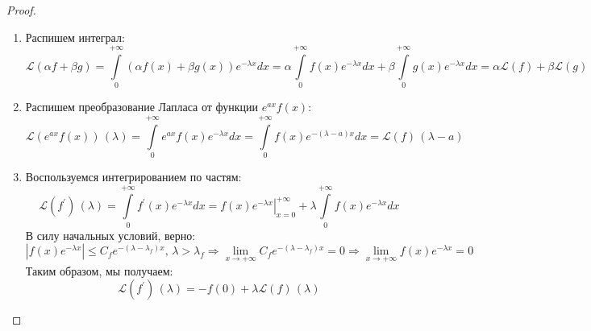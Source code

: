 \documentclass[12pt]{article}
\newcommand{\ML}{\mathcal{L}}
\theoremstyle{definition}
\newcommand{\ddint}[2]{\displaystyle\int\limits_{#1}^{#2}}
\begin{document}
\begin{proof}\hfill
	\begin{enumerate}[label ={(\arabic*)}]
		\item Распишем интеграл:
		$$
			\ML(\alpha f + \beta g) = \ddint{0}{+\infty}\left(\alpha f(x) + \beta g(x)\right)e^{-\lambda x}dx = \alpha\ddint{0}{+\infty}f(x) e^{-\lambda x}dx + \beta\ddint{0}{+\infty} g(x)e^{-\lambda x}dx = \alpha\ML(f) + \beta\ML(g) 
		$$
		
		\item Распишем преобразование Лапласа от функции $e^{ax}f(x)$:
		$$
			\ML(e^{ax}f(x))\,(\lambda) = \ddint{0}{+\infty}e^{ax}f(x)e^{-\lambda x}dx= \ddint{0}{+\infty}f(x)e^{-(\lambda - a)x}dx = \ML(f)\, (\lambda - a)
		$$
		
		\item Воспользуемся интегрированием по частям:
		$$
			\ML(f^\prime) \, (\lambda) = \ddint{0}{+\infty}f^\prime(x)e^{-\lambda x}dx = \left.f(x)e^{-\lambda x}\right|_{x = 0}^{+\infty} + \lambda \ddint{0}{+\infty}f(x)e^{-\lambda x}dx
		$$
		В силу начальных условий, верно: 
		$$
			\left|f(x)e^{-\lambda x}\right| \leq C_f e^{- (\lambda -\lambda_f)x }, \, \lambda > \lambda_f \Rightarrow \lim\limits_{x \to +\infty} C_f e^{- (\lambda -\lambda_f)x} = 0 \Rightarrow \lim\limits_{x \to +\infty}f(x)e^{-\lambda x} = 0
		$$ 
		Таким образом, мы получаем:
		$$
			\ML(f^\prime) \, (\lambda) = -f(0) + \lambda \ML(f)\, (\lambda)
		$$
		

\end{enumerate}
\end{proof}
\end{document}
